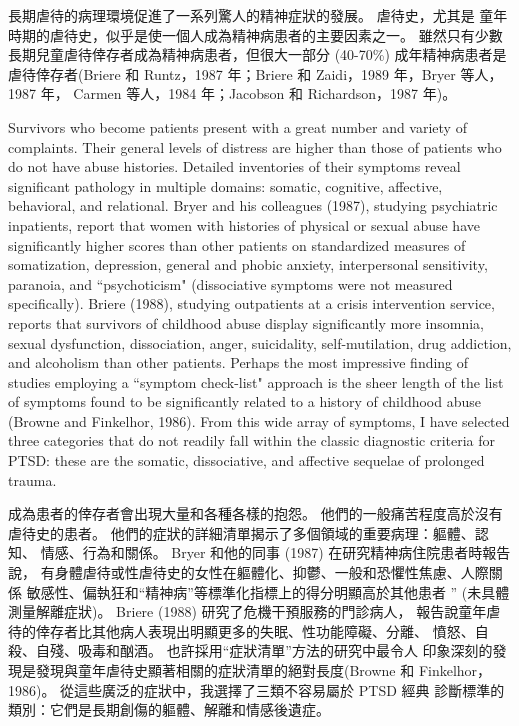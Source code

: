\documentclass[12pt]{article}
\begin{document}
    長期虐待的病理環境促進了一系列驚人的精神症狀的發展。 虐待史，尤其是
    童年時期的虐待史，似乎是使一個人成為精神病患者的主要因素之一。 雖然只有少數
    長期兒童虐待倖存者成為精神病患者，但很大一部分 (40-70\%) 成年精神病患者是
    虐待倖存者(Briere 和 Runtz，1987 年；Briere 和 Zaidi，1989 年，Bryer 等人，
    1987 年， Carmen 等人，1984 年；Jacobson 和 Richardson，1987 年)。

    Survivors who become patients present with a great number and variety of
    complaints. Their general levels of distress are higher than those of
    patients who do not have abuse histories. Detailed inventories of their
    symptoms reveal significant pathology in multiple domains: somatic,
    cognitive, affective, behavioral, and relational. Bryer and his colleagues
    (1987), studying psychiatric inpatients, report that women with histories
    of physical or sexual abuse have significantly higher scores than other
    patients on standardized measures of somatization, depression, general and
    phobic anxiety, interpersonal sensitivity, paranoia, and ``psychoticism"
    (dissociative symptoms were not measured specifically). Briere (1988),
    studying outpatients at a crisis intervention service, reports that
    survivors of childhood abuse display significantly more insomnia, sexual
    dysfunction, dissociation, anger, suicidality, self-mutilation, drug
    addiction, and alcoholism than other patients. Perhaps the most impressive
    finding of studies employing a ``symptom check-list" approach is the sheer
    length of the list of symptoms found to be significantly related to a
    history of childhood abuse (Browne and Finkelhor, 1986). From this wide
    array of symptoms, I have selected three categories that do not readily
    fall within the classic diagnostic criteria for PTSD: these are the
    somatic, dissociative, and affective sequelae of prolonged trauma.

    成為患者的倖存者會出現大量和各種各樣的抱怨。 他們的一般痛苦程度高於沒有
    虐待史的患者。 他們的症狀的詳細清單揭示了多個領域的重要病理：軀體、認知、
    情感、行為和關係。 Bryer 和他的同事 (1987) 在研究精神病住院患者時報告說，
    有身體虐待或性虐待史的女性在軀體化、抑鬱、一般和恐懼性焦慮、人際關係
    敏感性、偏執狂和“精神病”等標準化指標上的得分明顯高於其他患者 ”
    (未具體測量解離症狀)。 Briere (1988) 研究了危機干預服務的門診病人，
    報告說童年虐待的倖存者比其他病人表現出明顯更多的失眠、性功能障礙、分離、
    憤怒、自殺、自殘、吸毒和酗酒。 也許採用“症狀清單”方法的研究中最令人
    印象深刻的發現是發現與童年虐待史顯著相關的症狀清單的絕對長度(Browne 和
    Finkelhor，1986)。 從這些廣泛的症狀中，我選擇了三類不容易屬於 PTSD 經典
    診斷標準的類別：它們是長期創傷的軀體、解離和情感後遺症。
\end{document}
